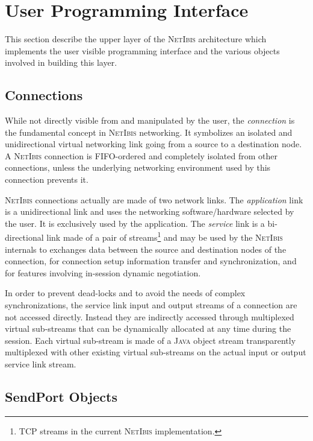 \documentclass[11pt]{book}
\def\Java{\textsc{Java}\xspace}
\def\NetIbis{\textsc{NetIbis}\xspace}
\begin{document}
\section{User Programming Interface}
\label{sec:user-progr-interf}

This section describe the upper layer of the \NetIbis architecture
which implements the user visible programming interface and the
various objects involved in building this layer.

\subsection{Connections}
\label{sec:connections-1}

While not directly visible from and manipulated by the user, the
\emph{connection} is the fundamental concept in \NetIbis networking.
It symbolizes an isolated and unidirectional virtual networking link
going from a source to a destination node. A \NetIbis connection is
FIFO-ordered and completely isolated from other connections, unless
the underlying networking environment used by this connection prevents
it.

\NetIbis connections actually are made of two network links. The
\emph{application} link is a unidirectional link and uses the
networking software/hardware selected by the user. It is exclusively
used by the application. The \emph{service} link is a bi-directional
link made of a pair of streams\footnote{TCP streams in the current
  \NetIbis implementation.} and may be used by the \NetIbis internals
to exchanges data between the source and destination nodes of the
connection, for connection setup information transfer and
synchronization, and for features involving in-session dynamic
negotiation.

In order to prevent dead-locks and to avoid the needs of complex
synchronizations, the service link input and output streams of a
connection are not accessed directly. Instead they are indirectly
accessed through multiplexed virtual sub-streams that can be
dynamically allocated at any time during the session. Each virtual
sub-stream is made of a \Java object stream transparently multiplexed
with other existing virtual sub-streams on the actual input or output
service link stream.

\subsection{SendPort Objects}
\label{sec:sendport-objects}
\end{document}

